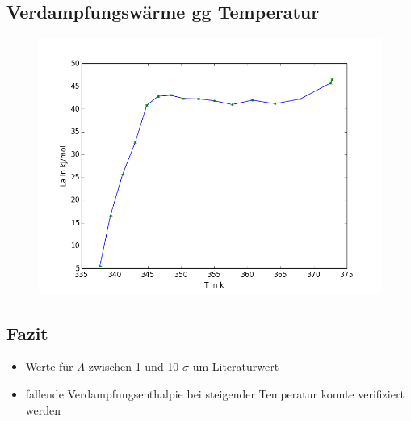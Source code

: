 \documentclass[11pt]{beamer}
\begin{document}
\subsection{Verdampfungswärme gg Temperatur}
\begin{frame}
\begin{figure}[H]
\centering
\includegraphics[scale=0.5]{Bilder/lamda_EL_neuerFehler.png}
\end{figure}
\end{frame}

\subsection{Fazit}
\begin{frame}
\begin{itemize}
\item Werte für $\Lambda$ zwischen 1 und 10 $\sigma$ um Literaturwert
\item fallende Verdampfungsenthalpie bei steigender Temperatur konnte verifiziert werden
\end{itemize}
\end{frame}
\end{document}
